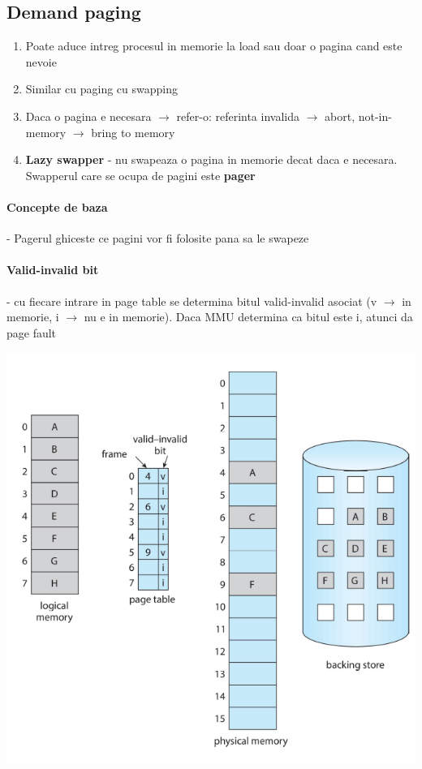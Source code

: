 \documentclass{article}
\begin{document}
\subsection*{Demand paging}
\begin{enumerate}
    \item Poate aduce intreg procesul in memorie la load sau doar o pagina cand este nevoie
    \item Similar cu paging cu swapping
    \item Daca o pagina e necesara $\rightarrow$ refer-o: referinta invalida $\rightarrow$ abort, not-in-memory $\rightarrow$ bring to memory
    \item \textbf{Lazy swapper} - nu swapeaza o pagina in memorie decat daca e necesara. Swapperul care se ocupa de pagini este \textbf{pager}
\end{enumerate}

\paragraph*{Concepte de baza} - Pagerul ghiceste ce pagini vor fi folosite pana sa le swapeze
\paragraph*{Valid-invalid bit} - cu fiecare intrare in page table se determina bitul valid-invalid asociat (v $\rightarrow$ in memorie, i $\rightarrow$ nu e in memorie). Daca MMU determina ca bitul este i, atunci da page fault
\begin{center}
    \includegraphics[scale=0.3]{31-vib.png}
\end{center}
\end{document}
